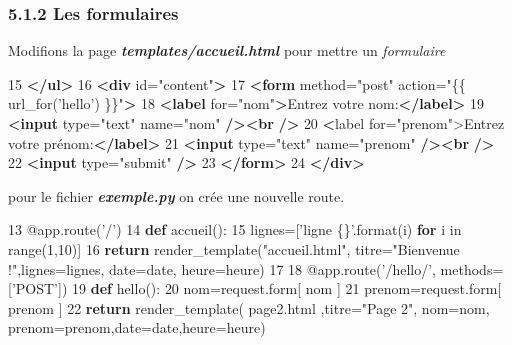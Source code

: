 \documentclass{article}
\newenvironment{Shaded}{}{}
\newcommand{\KeywordTok}[1]{\textcolor[rgb]{0.00,0.44,0.13}{\textbf{{#1}}}}
\newcommand{\DataTypeTok}[1]{\textcolor[rgb]{0.56,0.13,0.00}{{#1}}}
\newcommand{\DecValTok}[1]{\textcolor[rgb]{0.25,0.63,0.44}{{#1}}}
\newcommand{\StringTok}[1]{\textcolor[rgb]{0.25,0.44,0.63}{{#1}}}
\newcommand{\OtherTok}[1]{\textcolor[rgb]{0.00,0.44,0.13}{{#1}}}
\newcommand{\ErrorTok}[1]{\textcolor[rgb]{1.00,0.00,0.00}{\textbf{{#1}}}}
\newcommand{\NormalTok}[1]{{#1}}
\begin{document}
\subsubsection{5.1.2 Les formulaires}\label{les-formulaires}

Modifions la page \textbf{\emph{templates/accueil.html}} pour mettre un
\emph{formulaire}

\begin{Shaded}
\begin{Highlighting}[]
\NormalTok{15  }\KeywordTok{</ul>}
\NormalTok{16  }\KeywordTok{<div}\OtherTok{ id=}\StringTok{"content"}\KeywordTok{>}
\NormalTok{17     }\KeywordTok{<form}\OtherTok{ method=}\StringTok{"post"}\OtherTok{ action=}\StringTok{"\{\{ url_for('hello') \}\}"}\KeywordTok{>}
\NormalTok{18     }\KeywordTok{<label}\OtherTok{ for=}\StringTok{"nom"}\KeywordTok{>}\NormalTok{Entrez votre nom:}\KeywordTok{</label>}
\NormalTok{19     }\KeywordTok{<input}\OtherTok{ type=}\StringTok{"text"}\OtherTok{ name=}\StringTok{"nom"} \KeywordTok{/><br} \KeywordTok{/>}
\NormalTok{20     }\ErrorTok{<}\NormalTok{label for="prenom">Entrez votre prénom:}\KeywordTok{</label>}
\NormalTok{21     }\KeywordTok{<input}\OtherTok{ type=}\StringTok{"text"}\OtherTok{ name=}\StringTok{"prenom"} \KeywordTok{/><br} \KeywordTok{/>}
\NormalTok{22     }\KeywordTok{<input}\OtherTok{ type=}\StringTok{"submit"} \KeywordTok{/>}
\NormalTok{23     }\KeywordTok{</form>}
\NormalTok{24 }\KeywordTok{</div>}
\end{Highlighting}
\end{Shaded}

pour le fichier \textbf{\emph{exemple.py}} on crée une nouvelle route.

\begin{Shaded}
\begin{Highlighting}[]
\DecValTok{13}  \NormalTok{@app.route(}\StringTok{'/'}\NormalTok{)}
\DecValTok{14}  \KeywordTok{def} \NormalTok{accueil():}
\DecValTok{15}      \NormalTok{lignes=[}\StringTok{'ligne \{\}'}\NormalTok{.}\DataTypeTok{format}\NormalTok{(i) }\KeywordTok{for} \NormalTok{i in }\DataTypeTok{range}\NormalTok{(}\DecValTok{1}\NormalTok{,}\DecValTok{10}\NormalTok{)]}
\DecValTok{16}      \KeywordTok{return} \NormalTok{render_template(}\StringTok{"accueil.html"}\NormalTok{, titre=}\StringTok{"Bienvenue !"}\NormalTok{,lignes=lignes, date=date, heure=heure)}
\DecValTok{17}
\DecValTok{18} \NormalTok{@app.route(}\StringTok{'/hello/'}\NormalTok{, methods=[}\StringTok{'POST'}\NormalTok{])}
\DecValTok{19} \KeywordTok{def} \NormalTok{hello():}
\DecValTok{20}     \NormalTok{nom=request.form[ nom ]}
\DecValTok{21}     \NormalTok{prenom=request.form[ prenom ]}
\DecValTok{22}     \KeywordTok{return} \NormalTok{render_template( page2.html ,titre=}\StringTok{"Page 2"}\NormalTok{, nom=nom, prenom=prenom,date=date,heure=heure)}
\end{Highlighting}
\end{Shaded}
\end{document}
